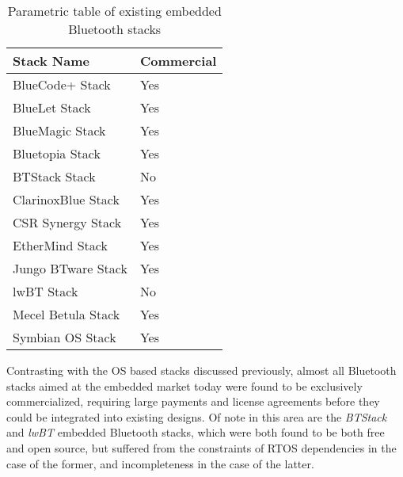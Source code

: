 \begin{table}[H]
	\begin{center}
		\begin{tabular}{ | l | l |}
			\hline
			\textbf{Stack Name}	& \textbf{Commercial} \\ \hline

			BlueCode+ Stack		& Yes	\\ \hline
			BlueLet Stack		& Yes	\\ \hline
			BlueMagic Stack		& Yes	\\ \hline
			Bluetopia Stack		& Yes	\\ \hline
			BTStack Stack		& No	\\ \hline
			ClarinoxBlue Stack	& Yes	\\ \hline
			CSR Synergy Stack	& Yes	\\ \hline
			EtherMind Stack		& Yes	\\ \hline
			Jungo BTware Stack	& Yes	\\ \hline
			lwBT Stack			& No	\\ \hline
			Mecel Betula Stack	& Yes	\\ \hline
			Symbian OS Stack	& Yes	\\ \hline
		\end{tabular}
		\caption[Existing Embedded Bluetooth Stacks]{Parametric table of existing embedded Bluetooth stacks}
		\label{tab:embbtstacks}
	\end{center}
\end{table}

Contrasting with the OS based stacks discussed previously, almost all Bluetooth stacks aimed at the embedded market today were found to be exclusively commercialized, requiring large payments and license agreements before they could be integrated into existing designs. Of note in this area are the \textit{BTStack} and \textit{lwBT} embedded Bluetooth stacks, which were both found to be both free and open source, but suffered from the constraints of RTOS dependencies in the case of the former, and incompleteness in the case of the latter.

